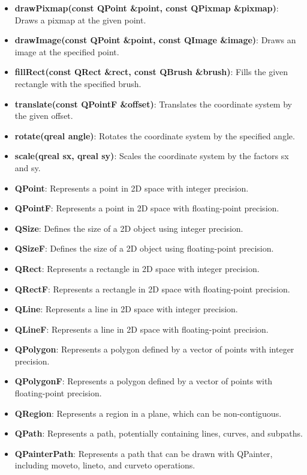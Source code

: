 \documentclass{report}
\begin{document}
\begin{itemize}
        \item \textbf{drawPixmap(const QPoint \&point, const QPixmap \&pixmap)}: Draws a pixmap at the given point.
        \item \textbf{drawImage(const QPoint \&point, const QImage \&image)}: Draws an image at the specified point.
        \item \textbf{fillRect(const QRect \&rect, const QBrush \&brush)}: Fills the given rectangle with the specified brush.
        \item \textbf{translate(const QPointF \&offset)}: Translates the coordinate system by the given offset.
        \item \textbf{rotate(qreal angle)}: Rotates the coordinate system by the specified angle.
        \item \textbf{scale(qreal sx, qreal sy)}: Scales the coordinate system by the factors sx and sy.
    \end{itemize}

    \pagebreak 
    \begin{itemize}
        \item \textbf{QPoint}: Represents a point in 2D space with integer precision.
        \item \textbf{QPointF}: Represents a point in 2D space with floating-point precision.
        \item \textbf{QSize}: Defines the size of a 2D object using integer precision.
        \item \textbf{QSizeF}: Defines the size of a 2D object using floating-point precision.
        \item \textbf{QRect}: Represents a rectangle in 2D space with integer precision.
        \item \textbf{QRectF}: Represents a rectangle in 2D space with floating-point precision.
        \item \textbf{QLine}: Represents a line in 2D space with integer precision.
        \item \textbf{QLineF}: Represents a line in 2D space with floating-point precision.
        \item \textbf{QPolygon}: Represents a polygon defined by a vector of points with integer precision.
        \item \textbf{QPolygonF}: Represents a polygon defined by a vector of points with floating-point precision.
        \item \textbf{QRegion}: Represents a region in a plane, which can be non-contiguous.
        \item \textbf{QPath}: Represents a path, potentially containing lines, curves, and subpaths.
        \item \textbf{QPainterPath}: Represents a path that can be drawn with QPainter, including moveto, lineto, and curveto operations.
    \end{itemize}
\end{document}

